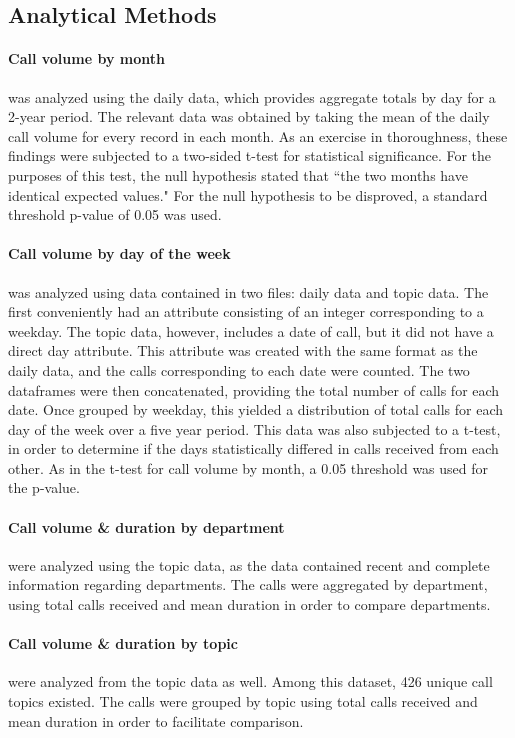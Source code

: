 \documentclass[12pt]{article}
\begin{document}
	\subsection{Analytical Methods}
	
\paragraph{Call volume by month} was analyzed using the daily data, which provides aggregate totals by day for a 2-year period. The relevant data was obtained by taking the mean of the daily call volume for every record in each month.  As an exercise in thoroughness, these findings were subjected to a two-sided t-test for statistical significance.  For the purposes of this test, the null hypothesis stated that “the two months have identical expected values."  For the null hypothesis to be disproved, a standard threshold p-value of 0.05 was used.

\paragraph{Call volume by day of the week} was analyzed using data contained in two files: daily data and topic data.  The first conveniently had an attribute consisting of an integer corresponding to a weekday.  The topic data, however, includes a date of call, but it did not have a direct day attribute.  This attribute was created with the same format as the daily data, and the calls corresponding to each date were counted.  The two dataframes were then concatenated, providing the total number of calls for each date.  Once grouped by weekday, this yielded a distribution of total calls for each day of the week over a five year period.  This data was also subjected to a t-test, in order to determine if the days statistically differed in calls received from each other.  As in the t-test for call volume by month, a 0.05 threshold was used for the p-value.

\paragraph{Call volume \& duration by department} were analyzed using the topic data, as the data contained recent and complete information regarding departments.  The calls were aggregated by department, using total calls received and mean duration in order to compare departments.

\paragraph{Call volume \& duration by topic} were analyzed from the topic data as well.  Among this dataset, 426 unique call topics existed.  The calls were grouped by topic using total calls received and mean duration in order to facilitate comparison.
\end{document}
